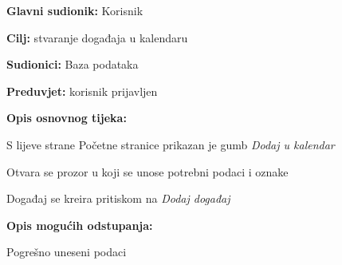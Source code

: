 					\noindent {}
					\begin{packed_item}
						
						\item \textbf{Glavni sudionik: }Korisnik
						\item  \textbf{Cilj:} stvaranje događaja u kalendaru
						\item  \textbf{Sudionici:}
						Baza podataka
						\item  \textbf{Preduvjet:} korisnik prijavljen
						\item  \textbf{Opis osnovnog tijeka:}
						
						\item[] \begin{packed_enum}
							
							\item	S lijeve strane Početne stranice prikazan je gumb \textit{Dodaj u kalendar}
							\item 	Otvara se prozor u koji se unose potrebni podaci i oznake
							\item	Događaj se kreira pritiskom na \textit{Dodaj događaj}
							
						\end{packed_enum}
						
						\item  \textbf{Opis mogućih odstupanja:}
						
						\item[] \begin{packed_item}
							
							\item[2.a] Pogrešno uneseni podaci
							
						\end{packed_item}
					\end{packed_item}
					
